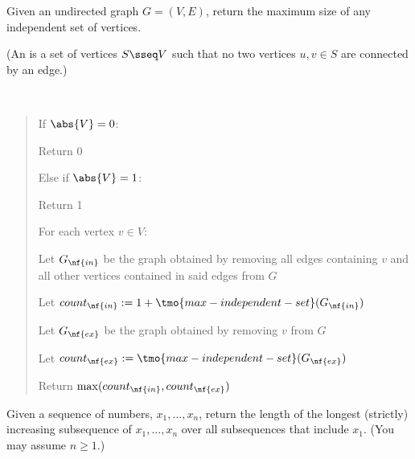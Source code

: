 \documentclass[10pt]{article}
\begin{document}
Given an undirected graph $ G = (V, E) $, return the maximum size of any independent set of vertices.

(An  is a set of vertices $ S\sseq V $ such that no two vertices $ u,v\in S $ are connected by an edge.)

\begin{solution}\ %
\begin{quote}%
  \noindent{}%


  \begin{steps}
    \item If $ \abs{V} = 0 $:
      \begin{steps}
      \item Return 0
      \end{steps}
    \item Else if $ \abs{V} = 1 $:
      \begin{steps}
      \item Return 1
      \end{steps}
    \item For each vertex $ v \in V $:
      \begin{steps}
      \item Let $ G_{\nf{in}} $ be the graph obtained by removing all edges containing $ v $ and all other vertices contained in said edges from $ G $
      \item Let $ count_{\nf{in}} := 1+\tmo{max-independent-set}(G_{\nf{in}}) $ 
      \item Let $ G_{\nf{ex}} $ be the graph obtained by removing $ v $ from $ G $
      \item Let $ count_{\nf{ex}} := \tmo{max-independent-set}(G_{\nf{ex}}) $ 
      \item Return $\max(count_{\nf{in}}, count_{\nf{ex}})$
      \end{steps}
  \end{steps}
\end{quote}%
\end{solution}%
\pagebreak

Given a sequence of numbers, $x_1, \ldots, x_n$, return the length of the longest (strictly) increasing subsequence of $x_1, \ldots, x_n$ over all subsequences that include $x_1$. (You may assume $n \geq 1$.)
\end{document}
